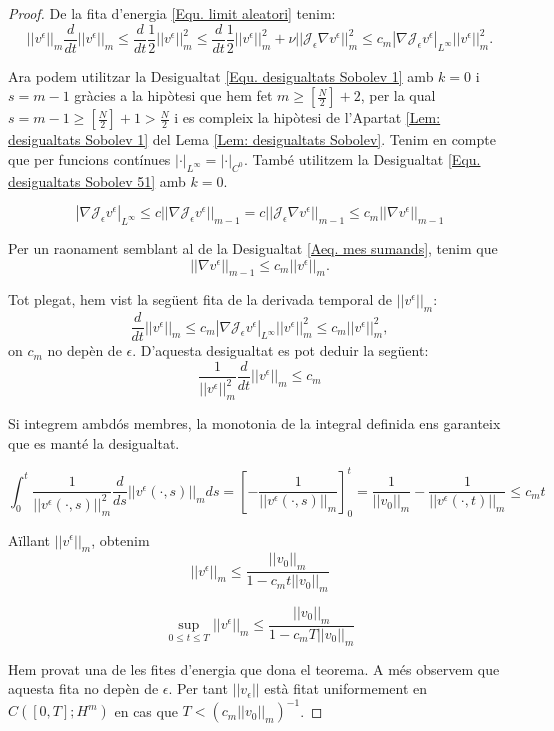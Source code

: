 \documentclass{article}
\numberwithin{equation}{section}
\begin{document}
\begin{proof}
De la fita d'energia \eqref{Equ. limit aleatori} tenim:
\[||v^{\epsilon}||_m\frac{d}{dt}||v^{\epsilon}||_m\leq\frac{d}{dt}\frac{1}{2}||v^{\epsilon}||_m^2\leq\frac{d}{dt}\frac{1}{2}||v^{\epsilon}||_m^2+\nu||\mathcal{J}_{\epsilon}\nabla v^{\epsilon}||_m^2\leq c_m|\nabla\mathcal{J}_{\epsilon}v^{\epsilon}|_{L^{\infty}}||v^{\epsilon}||_m^2.\]

Ara podem utilitzar la Desigualtat \eqref{Equ. desigualtats Sobolev 1} amb $k=0$ i $s=m-1$ gr\`{a}cies a la hip\`{o}tesi que hem fet $m\geq\left[\frac{N}{2}\right]+2$, per la qual $s=m-1\geq\left[\frac{N}{2}\right]+1>\frac{N}{2}$ i es compleix la hip\`{o}tesi de l'Apartat \ref{Lem: desigualtats Sobolev 1} del Lema \ref{Lem: desigualtats Sobolev}. Tenim en compte que per funcions cont\'{i}nues $|\cdot|_{L^{\infty}}=|\cdot|_{C^0}$. Tamb\'{e} utilitzem la Desigualtat \eqref{Equ. desigualtats Sobolev 51} amb $k=0$.

\[|\nabla\mathcal{J}_{\epsilon}v^{\epsilon}|_{L^{\infty}}\leq c||\nabla\mathcal{J}_{\epsilon}v^{\epsilon}||_{m-1}=c||\mathcal{J}_{\epsilon}\nabla v^{\epsilon}||_{m-1}\leq c_m||\nabla v^{\epsilon}||_{m-1}\]

Per un raonament semblant al de la Desigualtat \eqref{Aeq. mes sumands}, tenim que
\[||\nabla v^{\epsilon}||_{m-1}\leq c_m||v^{\epsilon}||_m.\]

Tot plegat, hem vist la seg\"{u}ent fita de la derivada temporal de $||v^{\epsilon}||_m$:
\[\frac{d}{dt}||v^{\epsilon}||_m\leq c_m|\nabla\mathcal{J}_{\epsilon}v^{\epsilon}|_{L^{\infty}}||v^{\epsilon}||_m^2\leq c_m||v^{\epsilon}||_m^2,\]
on $c_m$ no dep\`{e}n de $\epsilon$. D'aquesta desigualtat es pot deduir la seg\"{u}ent:
\[\frac{1}{||v^{\epsilon}||_m^2}\frac{d}{dt}||v^{\epsilon}||_m\leq c_m\]

Si integrem ambd\'{o}s membres, la monotonia de la integral definida ens garanteix que es mant\'{e} la desigualtat.

\[\int_0^t\frac{1}{||v^{\epsilon}(\cdot,s)||_m^2}\frac{d}{ds}||v^{\epsilon}(\cdot,s)||_mds=\left[-\frac{1}{||v^{\epsilon}(\cdot,s)||_m}\right]_0^t=\frac{1}{||v_0||_m}-\frac{1}{||v^{\epsilon}(\cdot,t)||_m}\leq c_mt\]

A\"{i}llant $||v^{\epsilon}||_m$, obtenim
\[||v^{\epsilon}||_m\leq\frac{||v_0||_m}{1-c_mt||v_0||_m}\]

\[\sup_{0\leq t\leq T}||v^{\epsilon}||_m\leq\frac{||v_0||_m}{1-c_mT||v_0||_m}\]

Hem provat una de les fites d'energia que dona el teorema. A m\'{e}s observem que aquesta fita no dep\`{e}n de $\epsilon$. Per tant $||v_{\epsilon}||$ est\`{a} fitat uniformement en $C([0,T];H^m)$ en cas que $T<(c_m||v_0||_m)^{-1}$.


\end{proof}
\end{document}
